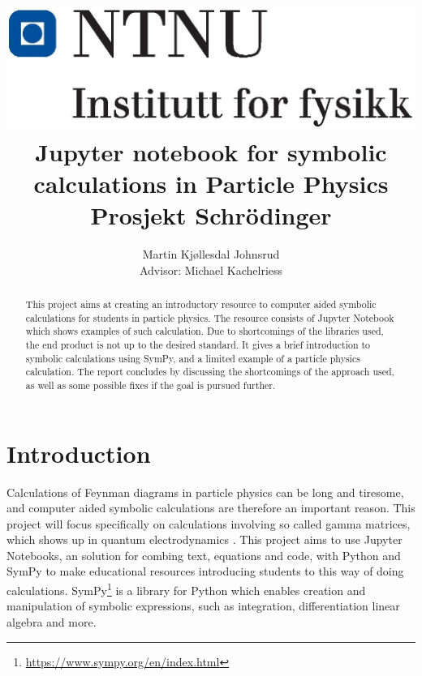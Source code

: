 \documentclass{article}
\title{
    \flushleft
    \includegraphics[width=.3\textwidth]{NTNU_logo.png}\\
    [1cm]
    \centering
    Jupyter notebook for symbolic calculations in Particle Physics
 \\
    \small{Prosjekt Schrödinger}
}
\author{
    Martin Kjøllesdal Johnsrud\\
    \small{Advisor: Michael Kachelriess}
    }
\begin{document}
    \maketitle
    \begin{abstract}
        This project aims at creating an introductory resource to computer aided symbolic calculations for students in particle physics.
        The resource consists of Jupyter Notebook which shows examples of such calculation.
        Due to shortcomings of the libraries used, the end product is not up to the desired standard.
        It gives a brief introduction to symbolic calculations using SymPy, and a limited example of a particle physics calculation.
        The report concludes by discussing the shortcomings of the approach used, as well as some possible fixes if the goal is pursued further.
       \end{abstract}

    \section*{Introduction}
    Calculations of Feynman diagrams in particle physics can be long and tiresome, and computer aided symbolic calculations are therefore an important reason.
    This project will focus specifically on calculations involving so called gamma matrices, which shows up in quantum electrodynamics \cite{griffiths}.
    This project aims to use Jupyter Notebooks, an solution for combing text, equations and code, with Python and SymPy to make educational resources introducing students to this way of doing calculations. 
    SymPy\footnote{\url{https://www.sympy.org/en/index.html}} is a library for Python which enables creation and manipulation of symbolic expressions, such as integration, differentiation linear algebra and more.
\end{document}
